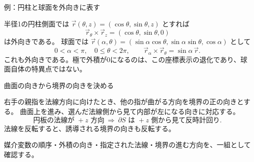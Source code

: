 \documentclass[a4paper,10pt,pdflatex,ja=standard,jafont=ipaex-type1,
  magstyle=real,scale=1]{bxjsarticle}
\newcommand{\topic}[1]{\par\vspace{5pt}%
  {\large\sffamily\mdseries\color{accent}#1}\par\vspace{2pt}}
\newcommand{\keybox}[1]{\par\vspace{3pt}\begingroup
  \setlength{\fboxsep}{4pt}%
  \colorbox{soft}{\parbox{\dimexpr\linewidth-2\fboxsep\relax}{\small #1}}%
  \endgroup\par\vspace{2pt}}
\begin{document}
\newpage
\noindent\begin{minipage}[b][\dimexpr0.5\textheight-\parskip\relax][t]{\linewidth}
\topic{例：円柱と球面を外向きに表す}
半径1の円柱側面では $\vec r(\theta,z)=(\cos\theta,\sin\theta,z)$ とすれば
$$
 \vec r_\theta\times\vec r_z=(\cos\theta,\sin\theta,0)
$$
は外向きである。
球面では $\vec r(\alpha,\theta)=(\sin\alpha\cos\theta,\sin\alpha\sin\theta,\cos\alpha)$ として
$$
 0<\alpha<\pi,\quad0\le\theta<2\pi,\qquad
 \vec r_\alpha\times\vec r_\theta=\sin\alpha\,\vec r.
$$
これも外向きである。極で外積が0になるのは、この座標表示の退化であり、球面自体の特異点ではない。


\topic{曲面の向きから境界の向きを決める}
右手の親指を法線方向に向けたとき、他の指が曲がる方向を境界の正の向きとする。
曲面上を進み、選んだ法線側から見て内部が左になる向きに対応する。
$$
 \text{円板の法線が }+z\text{ 方向}\ \Longrightarrow\
 \partial S\text{ は }+z\text{ 側から見て反時計回り}.
$$
法線を反転すると、誘導される境界の向きも反転する。
\keybox{媒介変数の順序・外積の向き・指定された法線・境界の進む方向を、一組として確認する。}


\end{minipage}
\end{document}
